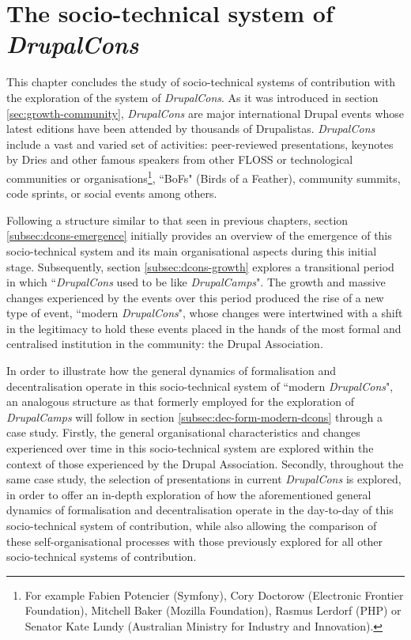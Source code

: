\chapter{The socio-technical system of \textit{DrupalCons}}
\label{mostly-offline-cons:chapter}

This chapter concludes the study of socio-technical systems of contribution with the exploration of the system of \textit{DrupalCons}. As it was introduced in section \ref{sec:growth-community}, \textit{DrupalCons} are major international Drupal events whose latest editions have been attended by thousands of Drupalistas. \textit{DrupalCons} include a vast and varied set of activities: peer-reviewed presentations, keynotes by Dries and other famous speakers  from other FLOSS or technological communities or organisations\footnote{For example Fabien Potencier (Symfony), Cory Doctorow (Electronic Frontier Foundation), Mitchell Baker (Mozilla Foundation), Rasmus Lerdorf (PHP) or Senator Kate Lundy (Australian Ministry for Industry and Innovation).}, ``BoFs" (Birds of a Feather), community summits, code sprints, or social events among others.

Following a structure similar to that seen in previous chapters, section \ref{subsec:dcons-emergence} initially provides an overview of the emergence of this socio-technical system and its main organisational aspects during this initial stage. Subsequently, section \ref{subsec:dcons-growth} explores a transitional period in which ``\textit{DrupalCons} used to be like \textit{DrupalCamps}". The growth and massive changes experienced by the events over this period produced the rise of a new type of event, ``modern \textit{DrupalCons}", whose changes were intertwined with a shift in the legitimacy to hold these events placed in the hands of the most formal and centralised institution in the community: the Drupal Association.

In order to illustrate how the general dynamics of formalisation and decentralisation operate in this socio-technical system of ``modern \textit{DrupalCons}", an analogous structure as that formerly employed for the exploration of \textit{DrupalCamps} will follow in section \ref{subsec:dec-form-modern-dcons} through a case study.  Firstly, the general organisational characteristics and changes experienced over time in this socio-technical system are explored within the context of those experienced by the Drupal Association. Secondly, throughout the same case study, the selection of presentations in current \textit{DrupalCons} is explored, in order to offer an in-depth exploration of how the aforementioned general dynamics of formalisation and decentralisation operate in the day-to-day of this socio-technical system of contribution, while also allowing the comparison of these self-organisational processes with those previously explored for all other socio-technical systems of contribution.


